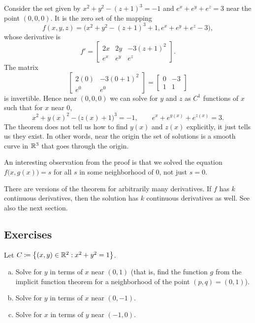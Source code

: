 \begin{example}
Consider the set given by $x^2+y^2-{(z+1)}^3 = -1$ and $e^x+e^y+e^z = 3$
near the point $(0,0,0)$.
It is the zero set of the mapping
\begin{equation*}
f(x,y,z) = \bigl(x^2+y^2-{(z+1)}^3+1,e^x+e^y+e^z-3\bigr) ,
\end{equation*}
whose derivative is
\begin{equation*}
f' =
\begin{bmatrix}
2x & 2y & -3{(z+1)}^2 \\
e^x & e^y & e^z
\end{bmatrix} .
\end{equation*}
The matrix
\begin{equation*}
\begin{bmatrix}
2(0) & -3{(0+1)}^2 \\
e^0 & e^0
\end{bmatrix}
=
\begin{bmatrix}
0 & -3 \\
1 & 1
\end{bmatrix}
\end{equation*}
is invertible.  Hence near $(0,0,0)$ we can solve for $y$ and $z$
as $C^1$ functions of $x$ such that for $x$ near $0$,
\begin{equation*}
x^2+y(x)^2-{\bigl(z(x)+1\bigr)}^3 = -1,
\qquad
e^x+e^{y(x)}+e^{z(x)} = 3 .
\end{equation*}
The theorem does not tell us how to find $y(x)$ and $z(x)$ explicitly,
it just tells us they exist.
In other words, near the origin the set of solutions is a
smooth curve in ${\mathbb{R}}^3$ that goes through the origin.
\end{example}

An interesting observation from the proof is that we solved the equation
$f\bigl(x,g(x)\bigr) = s$ for all $s$ in some neighborhood of $0$, not just
$s=0$.

\begin{remark}
There are versions of the theorem for arbitrarily many derivatives.
If $f$ has $k$ continuous derivatives, then the solution has $k$
continuous derivatives as well.  See also the next section.
\end{remark}


\subsection{Exercises}

\begin{exercise}
Let $C \coloneqq \bigl\{ (x,y) \in {\mathbb{R}}^2 : x^2+y^2 = 1 \bigr\}$.
\begin{enumerate}[a)]
\item
Solve for $y$ in terms of $x$ near $(0,1)$ (that is, find the function $g$
from the implicit function theorem for a neighborhood of the point $(p,q) = (0,1)$).
\item
Solve for $y$ in terms of $x$ near $(0,-1)$.
\item
Solve for $x$ in terms of $y$ near $(-1,0)$.
\end{enumerate}
\end{exercise}

